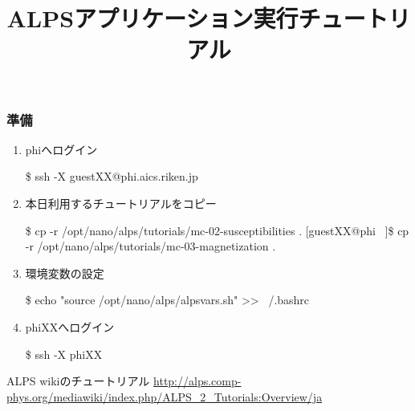 \title{ALPSアプリケーション実行チュートリアル}



\begin{frame}
  \titlepage
\end{frame}


\begin{frame}[fragile,shrink=10]
  \frametitle{準備}
  \begin{enumerate}
  \item<1-> phiへログイン
\begin{semiverbatim}
\$ ssh -X guestXX@phi.aics.riken.jp
\end{semiverbatim}
  \item<2-> 本日利用するチュートリアルをコピー
\begin{semiverbatim}
\$ cp -r /opt/nano/alps/tutorials/mc-02-susceptibilities .
[guestXX@phi ~]\$ cp -r /opt/nano/alps/tutorials/mc-03-magnetization .
\end{semiverbatim}
  \item<3-> 環境変数の設定
\begin{semiverbatim}
\$ echo "source /opt/nano/alps/alpsvars.sh" >> ~/.bashrc
\end{semiverbatim}
  \item<4-> phiXXへログイン
\begin{semiverbatim}
\$ ssh -X phiXX
\end{semiverbatim}
  \end{enumerate}
  \begin{alertblock}{ALPS wikiのチュートリアル}
    \url{http://alps.comp-phys.org/mediawiki/index.php/ALPS_2_Tutorials:Overview/ja}
  \end{alertblock}
\end{frame}

